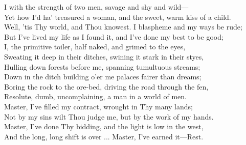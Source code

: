 \begin{poemblock}
I with the strength of two men, savage and shy and wild—\\
Yet how I'd ha' treasured a woman, and the sweet, warm kiss of a child.\\
Well, 'tis Thy world, and Thou knowest. I blaspheme and my ways be rude;\\
But I've lived my life as I found it, and I've done my best to be good;\\
I, the primitive toiler, half naked, and grimed to the eyes,\\
Sweating it deep in their ditches, swining it stark in their styes,\\
Hulling down forests before me, spanning tumultuous streams;\\
Down in the ditch building o'er me palaces fairer than dreams;\\
Boring the rock to the ore-bed, driving the road through the fen,\\
Resolute, dumb, uncomplaining, a man in a world of men.\\
Master, I've filled my contract, wrought in Thy many lands;\\
Not by my sins wilt Thou judge me, but by the work of my hands.\\
Master, I've done Thy bidding, and the light is low in the west,\\
And the long, long shift is over ... Master, I've earned it—Rest. 
\end{poemblock}
